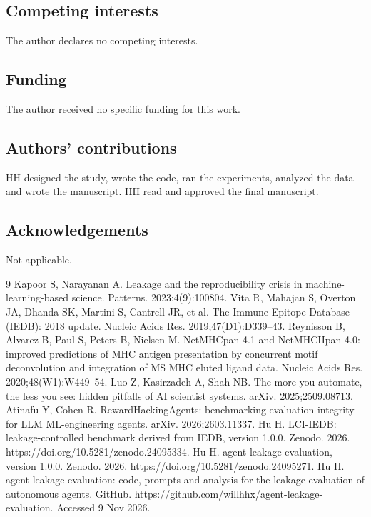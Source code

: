 \documentclass[11pt,a4paper]{article}
\begin{document}
\subsection*{Competing interests}
The author declares no competing interests.

\subsection*{Funding}
The author received no specific funding for this work.

\subsection*{Authors' contributions}
HH designed the study, wrote the code, ran the experiments, analyzed the data and wrote the manuscript. HH read and approved the final manuscript.

\subsection*{Acknowledgements}
Not applicable.



\begin{thebibliography}{9}
 Kapoor S, Narayanan A. Leakage and the reproducibility crisis in machine-learning-based science. Patterns. 2023;4(9):100804.
 Vita R, Mahajan S, Overton JA, Dhanda SK, Martini S, Cantrell JR, et al. The Immune Epitope Database (IEDB): 2018 update. Nucleic Acids Res. 2019;47(D1):D339--43.
 Reynisson B, Alvarez B, Paul S, Peters B, Nielsen M. NetMHCpan-4.1 and NetMHCIIpan-4.0: improved predictions of MHC antigen presentation by concurrent motif deconvolution and integration of MS MHC eluted ligand data. Nucleic Acids Res. 2020;48(W1):W449--54.
 Luo Z, Kasirzadeh A, Shah NB. The more you automate, the less you see: hidden pitfalls of AI scientist systems. arXiv. 2025;2509.08713.
 Atinafu Y, Cohen R. RewardHackingAgents: benchmarking evaluation integrity for LLM ML-engineering agents. arXiv. 2026;2603.11337.
 Hu H. LCI-IEDB: leakage-controlled benchmark derived from IEDB, version 1.0.0. Zenodo. 2026. https://doi.org/10.5281/zenodo.24095334.
 Hu H. agent-leakage-evaluation, version 1.0.0. Zenodo. 2026. https://doi.org/10.5281/zenodo.24095271.
 Hu H. agent-leakage-evaluation: code, prompts and analysis for the leakage evaluation of autonomous agents. GitHub. https://github.com/willhhx/agent-leakage-evaluation. Accessed 9 Nov 2026.
\end{thebibliography}
\end{document}
